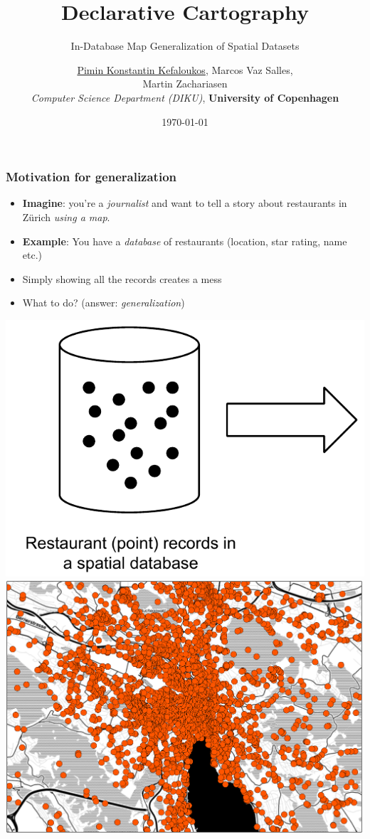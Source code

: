 \documentclass{beamer}
\title{Declarative Cartography}
\subtitle{In-Database Map Generalization of Spatial Datasets}
\author{\underline{Pimin Konstantin Kefaloukos}, Marcos Vaz Salles, \\Martin Zachariasen\\ \small{\emph{Computer Science Department (DIKU)}, \textbf{University of Copenhagen}}}
\date{\today}
\begin{document}
\frame{\titlepage}

\frame
{
  \frametitle{Motivation for generalization}
  \begin{itemize}
  \item \textbf{Imagine}: you're a \emph{journalist} and want to tell a story about restaurants in Z\"{u}rich \emph{using a map}.
  \item \textbf{Example}: You have a \emph{database} of restaurants (location, star rating, name etc.)
  \item Simply showing all the records creates a mess
  \item What to do? (answer: \emph{generalization})
  \end{itemize}
  \includegraphics[scale=0.5]{figs/spatial-database-with-points.pdf} \includegraphics[scale=0.18]{figs/zurich-unfiltered.pdf}
}
\end{document}
